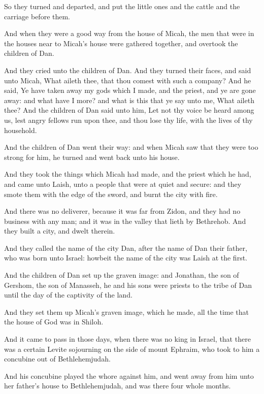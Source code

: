 \Verse So they turned and departed, and put the little ones and the cattle and the carriage before them.

\Verse And when they were a good way from the house of Micah, the men that were in the houses near to Micah's house were gathered together, and overtook the children of Dan.

\Verse And they cried unto the children of Dan. And they turned their faces, and said unto Micah, What aileth thee, that thou comest with such a company?  \Verse And he said, Ye have taken away my gods which I made, and the priest, and ye are gone away: and what have I more? and what is this that ye say unto me, What aileth thee?  \Verse And the children of Dan said unto him, Let not thy voice be heard among us, lest angry fellows run upon thee, and thou lose thy life, with the lives of thy household.

\Verse And the children of Dan went their way: and when Micah saw that they were too strong for him, he turned and went back unto his house.

\Verse And they took the things which Micah had made, and the priest which he had, and came unto Laish, unto a people that were at quiet and secure: and they smote them with the edge of the sword, and burnt the city with fire.

\Verse And there was no deliverer, because it was far from Zidon, and they had no business with any man; and it was in the valley that lieth by Bethrehob. And they built a city, and dwelt therein.

\Verse And they called the name of the city Dan, after the name of Dan their father, who was born unto Israel: howbeit the name of the city was Laish at the first.

\Verse And the children of Dan set up the graven image: and Jonathan, the son of Gershom, the son of Manasseh, he and his sons were priests to the tribe of Dan until the day of the captivity of the land.

\Verse And they set them up Micah's graven image, which he made, all the time that the house of God was in Shiloh.


\Chapter
\Verse And it came to pass in those days, when there was no king in Israel, that there was a certain Levite sojourning on the side of mount Ephraim, who took to him a concubine out of Bethlehemjudah.

\Verse And his concubine played the whore against him, and went away from him unto her father's house to Bethlehemjudah, and was there four whole months.

